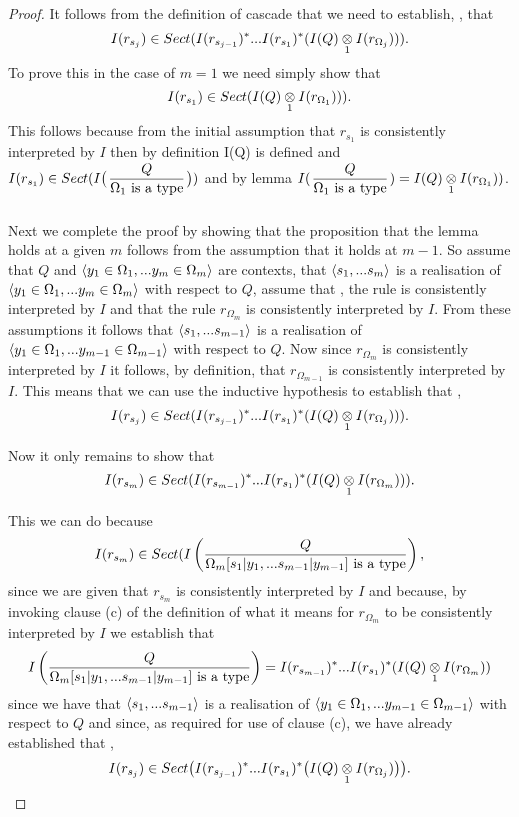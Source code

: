 \begin{proof}
It follows from the definition of cascade that we need to establish, \foreachj, that
 $$I(r_{s_j}) \in Sect(I(r_{s_{j-1}})^*...I(r_{s_1})^*(\crossx{I(Q)}{I(r_{\Omega_j})}{1})).$$
To prove this in the case of $m=1$ we need simply show that 
 $$I(r_{s_1}) \in Sect(\crossx{I(Q)}{I(r_{\Omega_1})}{1})).$$
 This follows because from the initial assumption that $r_{s_1}$ is consistently interpreted by $I$ then by definition
 I(Q) is defined and  $I(r_{s_1}) \in Sect(I\big(\gatdisplayrule{Q}{\isT{\Omega_1}}\big))$ 
 and by lemma  $I(\gatdisplayrule{Q}{\isT{\Omega_1}}) = \crossx{I(Q)}{I(r_{\Omega_1})}{1})$.

Next we complete the proof by showing that the proposition that the lemma holds at a given $m$ follows from
the assumption that it holds at $m-1$. So assume that $Q$  and $\encyOmega{m}$ are contexts, 
that $\tuple{\sm}$ is a realisation of $\tuple{\yOmega{m}}$ with respect to $Q$,
assume that \foreachj, the rule  is consistently interpreted by $I$ 
and that the rule $r_{\Omega_m}$ is consistently interpreted by $I$. 
From these assumptions it follows
that  $\tuple{\sm[-1]}$ is a realisation of $\tuple{\yOmega{m-1}}$ with respect to $Q$.
Now since $r_{\Omega_m}$ is consistently interpreted by $I$ it follows, by definition,  that $r_{\Omega_{m-1}}$ is consistently interpreted by $I$. This means that we can use the inductive hypothesis to establish that \foreachj[m-1],  
$$I(r_{s_j}) \in Sect(I(r_{s_{j-1}})^*...I(r_{s_1})^*(\crossx{I(Q)}{I(r_{\Omega_j})}{1})).$$

Now it only remains to show that
$$I(r_{s_m}) \in Sect(I(r_{s_{m-1}})^*...I(r_{s_1})^*(\crossx{I(Q)}{I(r_{\Omega_m})}{1})).$$

This we can do because
$$I(r_{s_m}) \in Sect(\Imappedrule{Q}{\isT{\Omega_m[\SUBsFORy{m-1}]}},$$ since we are given that $r_{s_m}$ is consistently interpreted by $I$
and because, by invoking clause (c) of the definition of what it means for $r_{\Omega_m}$ to be consistently interpreted by $I$
we establish that
 $$\Imappedrule{Q}{\isT{\Omega_m[\SUBsFORy{m-1}]}}= I(r_{s_{m-1}})^*...I(r_{s_1})^*(\crossx{I(Q)}{I(r_{\Omega_m})}{1})$$
 since we have that $\tuple{\sm[-1]}$ is a realisation of $\tuple{\yOmega{m-1}}$ with respect to $Q$
 and since, as required for use of clause (c), we have already established that \foreachj[m-1],  
$$I(r_{s_j}) \in Sect\big(I(r_{s_{j-1}})^*...I(r_{s_1})^*\big(\crossx{I(Q)}{I(r_{\Omega_j})}{1}\big)\big).$$
 \end{proof}

